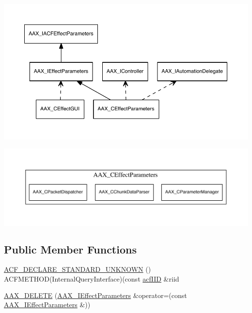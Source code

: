 \begin{DoxyImage}
\includegraphics[width=\textwidth,height=\textheight/2,keepaspectratio=true]{dot_aax_ieffectparams_related}
\caption{Classes related to A\+A\+X\+\_\+\+I\+Effect\+Parameters by inheritance or composition}
\end{DoxyImage}

\begin{DoxyImage}
\includegraphics[width=\textwidth,height=\textheight/2,keepaspectratio=true]{dot_aax_ieffectparams_contained}
\caption{Classes owned as member objects of A\+A\+X\+\_\+\+C\+Effect\+Parameters}
\end{DoxyImage}
\subsection*{Public Member Functions}
\begin{DoxyCompactItemize}
\item 
\hyperlink{a00099_a6be6ecdd9b96ca0d7723995e6dd4e478}{A\+C\+F\+\_\+\+D\+E\+C\+L\+A\+R\+E\+\_\+\+S\+T\+A\+N\+D\+A\+R\+D\+\_\+\+U\+N\+K\+N\+O\+W\+N} () A\+C\+F\+M\+E\+T\+H\+O\+D(Internal\+Query\+Interface)(const \hyperlink{a00150_a59df0b41744eee7a066787aaedf97f67}{acf\+I\+I\+D} \&riid
\item 
\hyperlink{a00099_ac3fdd3463ee1eeef3fb4a47750f71511}{A\+A\+X\+\_\+\+D\+E\+L\+E\+T\+E} (\hyperlink{a00099}{A\+A\+X\+\_\+\+I\+Effect\+Parameters} \&operator=(const \hyperlink{a00099}{A\+A\+X\+\_\+\+I\+Effect\+Parameters} \&))
\end{DoxyCompactItemize}
